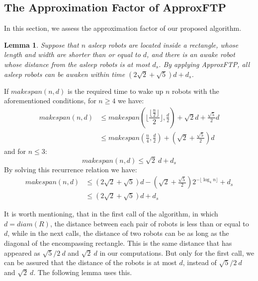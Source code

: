 \documentclass[review]{elsarticle}
\newtheorem{lemma}[theorem]{Lemma}
\def\QED{\ensuremath{{\square}}}
\def\markatright#1{\leavevmode\unskip\nobreak\quad\hspace*{\fill}{#1}}
\newenvironment{proof}
{\begin{trivlist}\item[\hskip\labelsep{\bf Proof.}]}
  {\markatright{\QED}\end{trivlist}}
\begin{document}
\subsection{The Approximation Factor of ApproxFTP}
In this section, we assess the approximation factor of our proposed algorithm.

\begin{lemma}
\label{lem:1}
Suppose that $n$ asleep robots are located inside a rectangle, whose length and width are shorter than or equal to $d$, and there is an awake robot whose distance from the asleep robots is at most $d_s$. By applying \textit{ApproxFTP}, all asleep robots can be awaken within time ${ (2\sqrt{2}+\sqrt{5})d+d_s }$.
\end{lemma}
\begin{proof}
If $makespan(n,d)$ is the required time to wake up $n$ robots with the aforementioned conditions, for $n\geq4$ we have:
\begin{align}
makespan(n,d) &\leq makespan(\bigg\lfloor \dfrac{\lfloor\frac{n}{2}\rfloor}{2} \bigg\rfloor, \frac{d}{2})+\!\sqrt{2}d+\!\frac{\sqrt{5}}{2}d \nonumber\\
				&\leq makespan(\frac{n}{4}, \frac{d}{2})+(\sqrt{2}+\frac{\sqrt{5}}{2})d \nonumber
\end{align}
and for $n\le3$:
$$ makespan(n,d) \leq \sqrt{2} ~d+d_s $$
By solving this recurrence relation we have:
\begin{align}
makespan(n,d) &\leq (2\sqrt{2}+\!\sqrt{5})d-\!(\sqrt{2}+\!\frac{\sqrt{5}}{2}) 2^{-\!\lfloor\log_4n \rfloor}+d_s \nonumber\\
				&\leq (2\sqrt{2}+\!\sqrt{5})d+d_s \nonumber
\end{align}
\end{proof}
It is worth mentioning, that in the first call of the algorithm, in which $d=diam(R)$, the distance between each pair of robots is less than or equal to $d$, while in the next calls, the distance of two robots can be as long as the diagonal of the encompassing rectangle. This is the same distance that has appeared as $\sqrt{5}/2~d$ and $\sqrt{2}~d$ in our computations. But only for the first call, we can be assured that the distance of the robots is at most $d$, instead of $\sqrt{5}/2~d$ and $\sqrt{2}~d$. The following lemma uses this.
\end{document}
